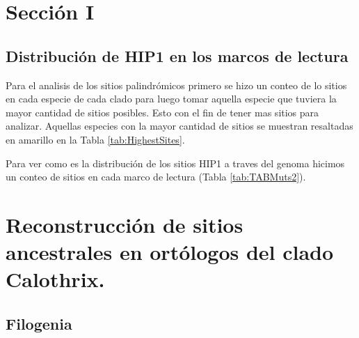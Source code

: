\documentclass[
]{book}
\begin{document}
\hypertarget{secciuxf3n-i}{%
\chapter*{Sección I}\label{secciuxf3n-i}}

\hypertarget{distribuciuxf3n-de-hip1-en-los-marcos-de-lectura}{%
\section{Distribución de HIP1 en los marcos de lectura}\label{distribuciuxf3n-de-hip1-en-los-marcos-de-lectura}}

Para el analisis de los sitios palindrómicos primero se hizo un conteo de lo sitios en cada especie de cada clado para luego tomar aquella especie que tuviera la mayor cantidad de sitios posibles. Esto con el fin de tener mas sitios para analizar. Aquellas especies con la mayor cantidad de sitios se muestran resaltadas en amarillo en la Tabla \ref{tab:HighestSites}.

Para ver como es la distribución de los sitios HIP1 a traves del genoma hicimos un conteo de sitios en cada marco de lectura (Tabla \ref{tab:TABMuts2}).

\hypertarget{reconstrucciuxf3n-de-sitios-ancestrales-en-ortuxf3logos-del-clado-calothrix.}{%
\chapter{Reconstrucción de sitios ancestrales en ortólogos del clado Calothrix.}\label{reconstrucciuxf3n-de-sitios-ancestrales-en-ortuxf3logos-del-clado-calothrix.}}

\hypertarget{filogenia-1}{%
\section{Filogenia}\label{filogenia-1}}
\end{document}
